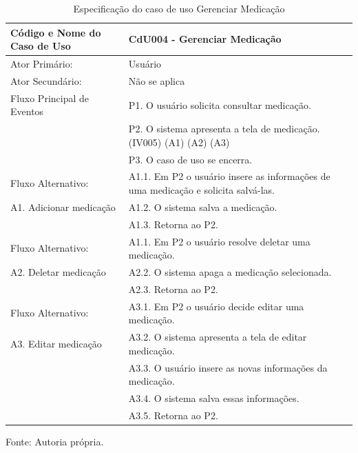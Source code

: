 \begin{apendicesenv}
\begin{table}[!h]
	\begin{center}
		\caption{Especificação do caso de uso Gerenciar Medicação}
		\begin{tabular}{ | l |  p{10cm} |}
			\hline
			Código e Nome do Caso de Uso & CdU004 - Gerenciar Medicação \\ \hline
			Ator Primário: & Usuário \\
			Ator Secundário: & Não se aplica \\ \hline
			Fluxo Principal de Eventos & P1. O usuário solicita consultar medicação. \\
						   & P2. O sistema apresenta a tela de medicação. (IV005) (A1) (A2) (A3) \\
						   & P3. O caso de uso se encerra. \\ \hline
			Fluxo Alternativo:         & A1.1. Em P2 o usuário insere as informações de uma medicação e solicita salvá-las. \\
			A1. Adicionar medicação    & A1.2. O sistema salva a medicação. \\
						   & A1.3. Retorna ao P2. \\ \hline
			Fluxo Alternativo:         & A1.1. Em P2 o usuário resolve deletar uma medicação. \\
			A2. Deletar medicação      & A2.2. O sistema apaga a medicação selecionada. \\
						   & A2.3. Retorna ao P2. \\ \hline
			Fluxo Alternativo:         & A3.1. Em P2 o usuário decide editar uma medicação. \\
			A3. Editar medicação       & A3.2. O sistema apresenta a tela de editar medicação. \\
						   & A3.3. O usuário insere as novas informações da medicação. \\
						   & A3.4. O sistema salva essas informações. \\
						   & A3.5. Retorna ao P2. \\
			\hline
		\end{tabular}
		Fonte: Autoria própria.
	\end{center}
\end{table}



\end{apendicesenv}
